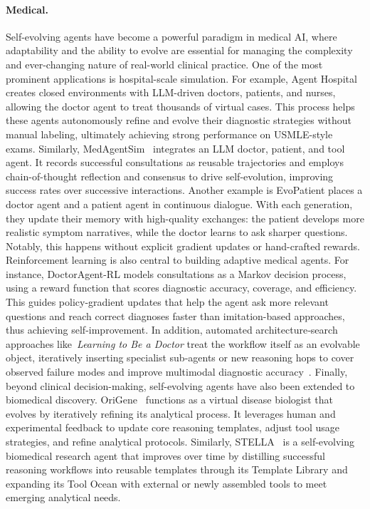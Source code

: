 \documentclass[10pt]{article} %
\begin{document}
\paragraph{Medical.}
Self-evolving agents have become a powerful paradigm in medical AI, where adaptability and the ability to evolve are essential for managing the complexity and ever-changing nature of real-world clinical practice.
One of the most prominent applications is hospital-scale simulation.
For example, Agent Hospital~\citep{agent2024hospital} creates closed environments with LLM-driven doctors, patients, and nurses, allowing the doctor agent to treat thousands of virtual cases. This process helps these agents autonomously refine and evolve their diagnostic strategies without manual labeling, ultimately achieving strong performance on USMLE-style exams.
Similarly, MedAgentSim~\citep{MedAgentSim2025} integrates an LLM doctor, patient, and tool agent. It records successful consultations as reusable trajectories and employs chain-of-thought reflection and consensus to drive self-evolution, improving success rates over successive interactions.
Another example is EvoPatient \citep{du2024evopatient} places a doctor agent and a patient agent in continuous dialogue. With each generation, they update their memory with high-quality exchanges: the patient develops more realistic symptom narratives, while the doctor learns to ask sharper questions. Notably, this happens without explicit gradient updates or hand-crafted rewards.
Reinforcement learning is also central to building adaptive medical agents. For instance, DoctorAgent-RL \citep{doctoragentRL2025} models consultations as a Markov decision process, using a reward function that scores diagnostic accuracy, coverage, and efficiency. This guides policy-gradient updates that help the agent ask more relevant questions and reach correct diagnoses faster than imitation-based approaches, thus achieving self-improvement.
In addition, automated architecture‑search approaches like~\textit{Learning to Be a Doctor} treat the workflow itself as an evolvable object, iteratively inserting specialist sub‑agents or new reasoning hops to cover observed failure modes and improve multimodal diagnostic accuracy~\citep{zhuang2025archsearch}. Finally, beyond clinical decision-making, self-evolving agents have also been extended to biomedical discovery. OriGene~\citep{zhang2025origene} functions as a virtual disease biologist that evolves by iteratively refining its analytical process. It leverages human and experimental feedback to update core reasoning templates, adjust tool usage strategies, and refine analytical protocols. Similarly, STELLA~\citep{jin2025stella} is a self-evolving biomedical research agent that improves over time by distilling successful reasoning workflows into reusable templates through its Template Library and expanding its Tool Ocean with external or newly assembled tools to meet emerging analytical needs.
\end{document}
